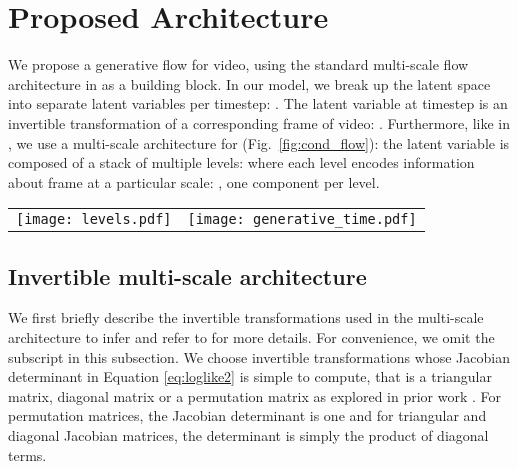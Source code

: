 \documentclass{article} \usepackage{iclr2020_conference,times}
\begin{document}
\section{Proposed Architecture}
\label{video-glow}



We propose a generative flow for video, using the standard multi-scale flow architecture in \citep{dinh2016density,kingma2018glow} as a building block. In our model, we break up the latent space  into separate latent variables per timestep: . The latent variable  at timestep  is an invertible transformation of a corresponding frame of video: . Furthermore, like in \citep{dinh2016density,kingma2018glow}, we use a multi-scale architecture for  (Fig.~\ref{fig:cond_flow}): the latent variable  is composed of a stack of multiple levels: where each level  encodes information about frame  at a particular scale:  , one component  per level.

\begin{figure*}
\centering
\begin{tabular}{cc}

\texttt{[image: levels.pdf]} & \texttt{[image: generative\_time.pdf]} \\
\end{tabular}

\caption{\textbf{Left: Multi-scale prior} The flow model uses a multi-scale architecture using several levels of stochastic variables. \textbf{Right: Autoregressive latent-dynamic prior} The input at each timestep  is encoded into multiple levels of stochastic variables . We model those levels through a sequential process .}
\label{fig:cond_flow}
\end{figure*}

\subsection{Invertible multi-scale architecture}

We first briefly describe the invertible transformations used in the multi-scale architecture to infer  and refer to \citep{dinh2016density,kingma2018glow} for more details. For convenience, we omit the subscript  in this subsection. We choose invertible transformations whose Jacobian determinant in Equation \ref{eq:loglike2} is simple to compute, that is a triangular matrix, diagonal matrix or a permutation matrix as explored in prior work \citep{rezende2015variational,deco1995higher}. For permutation matrices, the Jacobian determinant is one
and for triangular and diagonal Jacobian matrices, the determinant is simply the product of diagonal terms.
\end{document}
